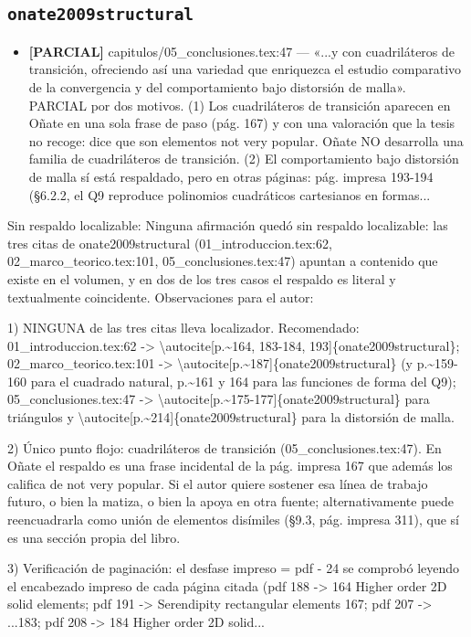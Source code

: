 \documentclass[11pt,a4paper]{article}
\newcommand{\campo}[1]{\textcolor{gris}{\footnotesize #1}}
\begin{document}
\subsection{\texttt{onate2009structural}}
\begin{itemize}\small
\item \textbf{[PARCIAL]} capitulos/05\_conclusiones.tex:47 --- «...y con cuadriláteros de transición, ofreciendo así una variedad que enriquezca el estudio comparativo de la convergencia y del comportamiento bajo distorsión de malla».
\\ \campo{PARCIAL por dos motivos. (1) Los \textquotedbl{}cuadriláteros de transición\textquotedbl{} aparecen en Oñate en una sola frase de paso (pág. 167) y con una valoración que la tesis no recoge: dice que son elementos \textquotedbl{}not very popular\textquotedbl{}. Oñate NO desarrolla una familia de cuadriláteros de transición. (2) El \textquotedbl{}comportamiento bajo distorsión de malla\textquotedbl{} sí está respaldado, pero en otras páginas: pág. impresa 193-194 (§6.2.2, el Q9 reproduce polinomios cuadráticos cartesianos en formas...}
\end{itemize}
{\small\campo{Sin respaldo localizable:} Ninguna afirmación quedó sin respaldo localizable: las tres citas de onate2009structural (01\_introduccion.tex:62, 02\_marco\_teorico.tex:101, 05\_conclusiones.tex:47) apuntan a contenido que existe en el volumen, y en dos de los tres casos el respaldo es literal y textualmente coincidente. Observaciones para el autor:

1) NINGUNA de las tres citas lleva localizador. Recomendado: 01\_introduccion.tex:62 -\textgreater{} \textbackslash{}autocite[p.\textasciitilde{}164, 183-184, 193]\{onate2009structural\}; 02\_marco\_teorico.tex:101 -\textgreater{} \textbackslash{}autocite[p.\textasciitilde{}187]\{onate2009structural\} (y p.\textasciitilde{}159-160 para el cuadrado natural, p.\textasciitilde{}161 y 164 para las funciones de forma del Q9); 05\_conclusiones.tex:47 -\textgreater{} \textbackslash{}autocite[p.\textasciitilde{}175-177]\{onate2009structural\} para triángulos y \textbackslash{}autocite[p.\textasciitilde{}214]\{onate2009structural\} para la distorsión de malla.

2) Único punto flojo: \textquotedbl{}cuadriláteros de transición\textquotedbl{} (05\_conclusiones.tex:47). En Oñate el respaldo es una frase incidental de la pág. impresa 167 que además los califica de \textquotedbl{}not very popular\textquotedbl{}. Si el autor quiere sostener esa línea de trabajo futuro, o bien la matiza, o bien la apoya en otra fuente; alternativamente puede reencuadrarla como \textquotedbl{}unión de elementos disímiles\textquotedbl{} (§9.3, pág. impresa 311), que sí es una sección propia del libro.

3) Verificación de paginación: el desfase impreso = pdf - 24 se comprobó leyendo el encabezado impreso de cada página citada (pdf 188 -\textgreater{} \textquotedbl{}164 Higher order 2D solid elements\textquotedbl{}; pdf 191 -\textgreater{} \textquotedbl{}Serendipity rectangular elements 167\textquotedbl{}; pdf 207 -\textgreater{} \textquotedbl{}...183\textquotedbl{}; pdf 208 -\textgreater{} \textquotedbl{}184 Higher order 2D solid...\par}
\end{document}
